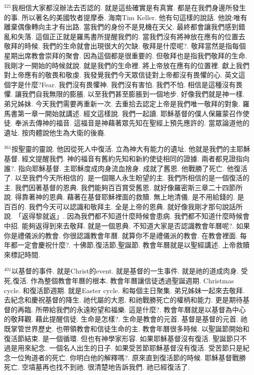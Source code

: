 \documentclass{book}
\begin{document}
$^{321}$我相信大家都沒辦法去否認的.
就是這些確實是有真實.
都是在我們身邊所發生的事.
所以著名的美國牧者提摩泰.
海南Tim Keller.
他有句這樣的說話.
他說:唯有離棄偶像轉向主才有出路.
當我們的身份不是見機在天父.
最終都會讓我們感到錯亂和失落.
這個正正就是羅馬書所提醒我們的.
當我們沒有將神放在應有的位置去敬拜的時候.
我們的生命就會出現很大的欠缺.
敬拜是什麼呢?.
敬拜當然是指每個星期出席教會崇拜的聚會.
因為這個都是很重要的.
但敬拜也是指我們敬拜的生命.
我剛才一開始的時候就說.
就是我們的生命裡.
將上帝放在應有的位置裡.
獻上我們對上帝應有的敬畏和敬虔.
我發覺我們今天眾信徒對上帝都沒有畏懼的心.
英文這個字是什麼?Fear.
我們沒有畏懼神.
我們沒有害怕.
我們不怕.
相信是這種沒有畏懼.
讓我們自我無限的膨脹.
以至我們甚至膨脹到一個地步.
好像我們就是神一樣.
弟兄姊妹.
今天我們需要再重新一次.
去重拾去認定上帝是我們唯一敬拜的對象.
羅馬書第一章一開始就講述.
經文這樣說.
我們一起讀.
耶穌基督的僕人保羅蒙召作使徒.
奉派去傳神的福音.
這福音是神藉著眾先知在聖經上預先應許的.
當眾論道他的遺址.
按肉體說他生為大衛的後裔.

$^{361}$按聖靈的靈說.
他因從死人中復活.
立為神大有能力的遺址.
他就是我們的主耶穌基督.
經文提醒我們.
神的福音有舊約先知和新約使徒相同的證據.
兩者都見證指向誰?.
指向耶穌基督.
主耶穌度成肉身流血捨身.
成就了舊恩.
他戰勝了死亡.
他復活了.
以至我們今天所相信的.
是一個賜人永生盼望的主.
我們所相信的是一個復活的主.
我們因著基督的恩典.
我們能夠百百賞受舊恩.
就好像羅密斯三章二十四節所說.
得靠著神的恩典.
藉著在基督耶穌裡面的救贖.
無上地清儀.
是不用給錢的.
是百百的.
我們今天可以認識和敬拜主.
全是上帝的恩典.
就好像我剛才那句說話所說.
「返得黎就返」.
因為我們都不知道什麼時候會患病.
我們都不知道什麼時候會中招.
能夠返得到來去敬拜.
就是一個恩典.
不知道大家是否認識教會年曆呢?.
如果你是禮儀派的教會.
你很認識教會年曆.
就算你不是禮儀派的教會.
在教會裡面.
每年都一定會慶祝什麼?.
十佛節,復活節,聖誕節.
教會年曆就是以聖經講述.
上帝救贖來標記時間.

$^{401}$以基督的事件.
就是Christ的event.
就是基督的一生事件.
就是祂的道成肉身.
受死,復活.
作為整個教會年曆的根本.
教會年曆讓信徒透過聖誕週期.
Christmas cycle.
和復活節週期.
就是Easter cycle.
和每個主日聚集.
弟兄姊妹一起來去敬拜.
去紀念和慶祝基督的降生.
祂代屬的大恩.
和祂戰勝死亡的權柄和能力.
更是期待基督的再臨.
所帶給我們的永遠盼望和福樂.
這是什麼?.
教會年曆就是以基督為中心的敬拜觀.
藉此提醒信徒.
生命是怎樣?.
生命是教會的元首.
基督是基督的元首.
祂既掌管世界歷史.
也帶領教會和信徒生命的主.
教會年曆很多時候.
以聖誕節開始和復活節結束.
是一個循環.
但也有神學家形容.
如果耶穌基督沒有復活.
聖誕節只不過是用來紀念.
一個名人出生的日子.
如果受苦節耶穌基督沒有復活.
受苦節只是紀念一位殉道者的死亡.
你明白他的解釋嗎?.
原來直到復活節的時候.
耶穌基督戰勝死亡.
空墳墓再也找不到祂.
很清楚地告訴我們.
祂已經復活了.
\end{document}
